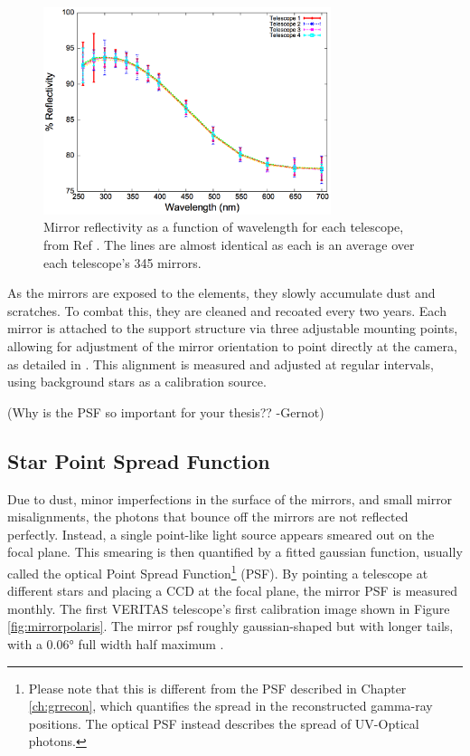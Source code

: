 \begin{figure}[ht]
  \centering
  \includegraphics[width=0.75\textwidth]{images/mirror_reflect}
  \caption[Mirror Reflectivity]{
    Mirror reflectivity as a function of wavelength for each telescope, from Ref \cite{mirrorfacets}. 
    The lines are almost identical as each is an average over each telescope's 345 mirrors.
  }
  \label{fig:mirreflect}
\end{figure}

As the mirrors are exposed to the elements, they slowly accumulate dust and scratches.
To combat this, they are cleaned and recoated every two years.
Each mirror is attached to the support structure via three adjustable mounting points, allowing for adjustment of the mirror orientation to point directly at the camera, as detailed in \cite{mirroralign}.
This alignment is measured and adjusted at regular intervals, using background stars as a calibration source.

{\color{red}(Why is the PSF so important for your thesis?? -Gernot)}


\subsection{Star Point Spread Function}

Due to dust, minor imperfections in the surface of the mirrors, and small mirror misalignments, the photons that bounce off the mirrors are not reflected perfectly.
Instead, a single point-like light source appears smeared out on the focal plane.
This smearing is then quantified by a fitted gaussian function, usually called the optical Point Spread Function\footnote{Please note that this is different from the PSF described in Chapter \ref{ch:grrecon}, which quantifies the spread in the reconstructed gamma-ray positions.  The optical PSF instead describes the spread of UV-Optical photons.} (PSF).
By pointing a telescope at different stars and placing a CCD at the focal plane, the mirror PSF is measured monthly.
The first VERITAS telescope's first calibration image shown in Figure \ref{fig:mirrorpolaris}.
The mirror psf roughly gaussian-shaped but with longer tails, with a $ \ang{0.06} $ full width half maximum \cite{Veritas_Detector}.

